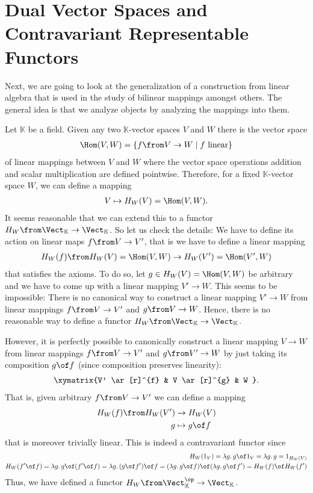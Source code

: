 \documentclass{article}
\theoremstyle{definition}
\begin{document}
\section{Dual Vector Spaces and Contravariant Representable Functors}
Next, we are going to look at the generalization of a construction from linear algebra that is used in the study of bilinear mappings amongst others. The general idea is that we analyze objects by analyzing the mappings into them.

Let $\mathbb K$ be a field. Given any two $\mathbb K$-vector spaces $V$ and $W$ there is the vector space 
\begin{align*}
  \Hom(V,W)=\{f\from V\to W\mid f \text{ linear}\}
\end{align*}
of linear mappings between $V$ and $W$ where the vector space operations addition and scalar multiplication are defined pointwise. Therefore, for a fixed $\mathbb K$-vector space $W$, we can define a mapping
\begin{align*}
  V\mapsto H_W(V)=\Hom(V,W).
\end{align*}
It seems reasonable that we can extend this to a functor $H_W\from\Vect_{\mathbb K}\to\Vect_{\mathbb K}$. So let us check the details: We have to define its action on linear maps $f\from V\to V'$, that is we have to define a linear mapping 
\begin{align*}
  H_W(f)\from H_W(V)=\Hom(V,W)\to H_W(V')=\Hom(V',W)
\end{align*}
 that satisfies the axioms. To do so, let $g\in H_W(V)=\Hom(V,W)$ be arbitrary and we have to come up with a linear mapping $V'\to W$. This seems to be impossible: There is no canonical way to construct a linear mapping $V'\to W$ from linear mappings $f\from V\to V'$ and $g\from V\to W$. Hence, there is no reasonable way to define a functor $H_W\from\Vect_{\mathbb K}\to\Vect_{\mathbb K}$.

However, it is perfectly possible to canonically construct a linear mapping $V\to W$ from linear mappings $f\from V\to V'$ and $g\from V'\to W$ by just taking its composition $g\of f$ (since composition preserves linearity):
\begin{align*}
  \xymatrix{V' \ar[r]^{f} & V \ar[r]^{g} & W }.
\end{align*}
That is, given arbitrary $f\from V\to V'$ we can define a mapping
\begin{align*}
  H_W(f)\from H_W(V')&\to H_W(V)\\
  g&\mapsto g\of f
\end{align*}
that is moreover trivially linear. This is indeed a contravariant functor since
\begin{align*}
  H_W(1_V)=\lambda g\ldotp g\of 1_V=\lambda g\ldotp g=1_{H_W(V)}\\
  H_W(f'\of f)=\lambda g\ldotp g\of (f'\of f)=\lambda g\ldotp (g\of f')\of f=(\lambda g\ldotp g\of f)\of (\lambda g\ldotp g\of f')=H_W(f)\of H_W(f')
\end{align*}
Thus, we have defined a functor $H_W\from\Vect_{\mathbb K}^\op\to\Vect_{\mathbb K}$. 
\end{document}
